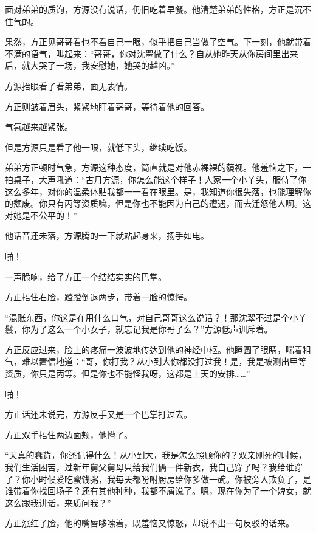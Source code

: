 
\begin{this_body}



面对弟弟的质询，方源没有说话，仍旧吃着早餐。他清楚弟弟的性格，方正是沉不住气的。

果然，方正见哥哥看也不看自己一眼，似乎把自己当做了空气。下一刻，他就带着不满的语气，叫起来：“哥哥，你对沈翠做了什么？自从她昨天从你房间里出来后，就大哭了一场，我安慰她，她哭的越凶。”

方源抬眼看了看弟弟，面无表情。

方正则皱着眉头，紧紧地盯着哥哥，等待着他的回答。

气氛越来越紧张。

但是方源只是看了他一眼，就低下头，继续吃饭。

弟弟方正顿时气急，方源这种态度，简直就是对他赤裸裸的藐视。他羞恼之下，一拍桌子，大声吼道：“古月方源，你怎么能这个样子！人家一个小丫头，服侍了你这么多年，对你的温柔体贴我都一一看在眼里。是，我知道你很失落，也能理解你的颓废。你只有丙等资质嘛，但是你也不能因为自己的遭遇，而去迁怒他人啊。这对她是不公平的！”

他话音还未落，方源腾的一下就站起身来，扬手如电。

啪！

一声脆响，给了方正一个结结实实的巴掌。

方正捂住右脸，蹬蹬倒退两步，带着一脸的惊愕。

“混账东西，你这是在用什么口气，对自己哥哥这么说话？！那沈翠不过是个小丫鬟，你为了这么一个小女子，就忘记我是你哥了么？”方源低声训斥着。

方正反应过来，脸上的疼痛一波波地传达到他的神经中枢。他瞪圆了眼睛，喘着粗气，难以置信地道：“哥，你打我？从小到大你都没打过我！是，我是被测出甲等资质，你只是丙等。但是你也不能怪我呀，这都是上天的安排……”

啪！

方正话还未说完，方源反手又是一个巴掌打过去。

方正双手捂住两边面颊，他懵了。

“天真的蠢货，你还记得什么！从小到大，我是怎么照顾你的？双亲刚死的时候，我们生活困苦，过新年舅父舅母只给我们俩一件新衣，我自己穿了吗？我给谁穿了？你小时候爱吃蜜饯粥，我每天都吩咐厨房给你多做一碗。你被旁人欺负了，是谁带着你找回场子？还有其他种种，我都不屑说了。嗯，现在你为了一个婢女，就这么跟我讲话，来质问我？”

方正涨红了脸，他的嘴唇哆嗦着，既羞恼又惊怒，却说不出一句反驳的话来。


\end{this_body}
